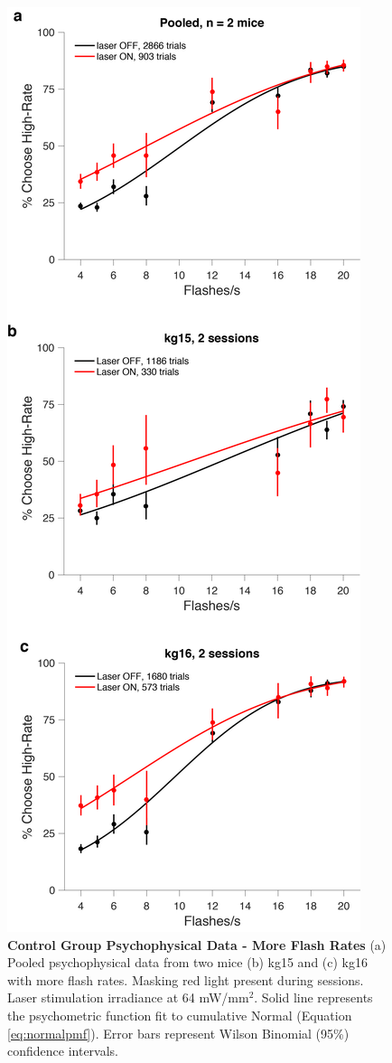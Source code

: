 \begin{figure}
  \centering
   \includegraphics[width=\textwidth,height=0.75\textheight,keepaspectratio]{Figures/chapter4/jaws_controls_house_red_full_rates_PMFs.png}
  \caption[Control Group Psychophysical Data - More Flash Rates]{\textbf{Control Group Psychophysical Data - More Flash Rates} (a) Pooled psychophysical data from two mice (b) kg15 and (c) kg16 with more flash rates. Masking red light present during sessions. Laser stimulation irradiance at 64 mW/mm$^{2}$. Solid line represents the psychometric function fit to cumulative Normal (Equation \ref{eq:normalpmf}). Error bars represent Wilson Binomial (95\%) confidence intervals. }
   \label{fig:ctrlpmfs}
\end{figure}
